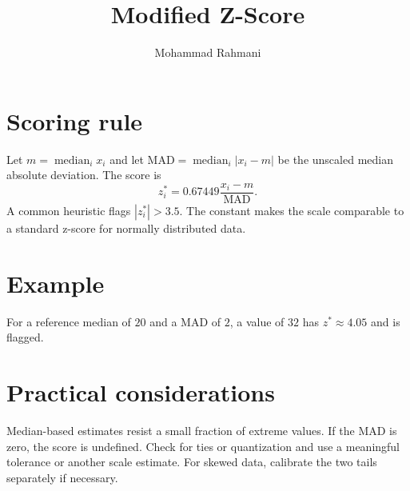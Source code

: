 \documentclass[a4paper]{article}
\title{Modified Z-Score}
\date{}
\author{Mohammad Rahmani}
\begin{document}
   \maketitle

\section{Scoring rule}
Let \(m=\operatorname{median}_i x_i\) and let \(\mathrm{MAD}=\operatorname{median}_i |x_i-m|\) be the unscaled median absolute deviation. The score is
\[
z_i^* = 0.67449\frac{x_i-m}{\mathrm{MAD}}.
\]
A common heuristic flags \(|z_i^*|>3.5\). The constant makes the scale comparable to a standard z-score for normally distributed data.

\section{Example}
For a reference median of \(20\) and a MAD of \(2\), a value of \(32\) has \(z^*\approx 4.05\) and is flagged.

\section{Practical considerations}
Median-based estimates resist a small fraction of extreme values. If the MAD is zero, the score is undefined. Check for ties or quantization and use a meaningful tolerance or another scale estimate. For skewed data, calibrate the two tails separately if necessary.



   
   
\end{document}
